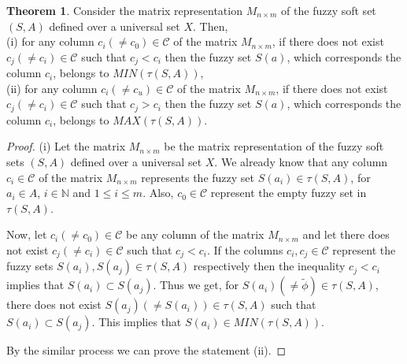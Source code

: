 \documentclass{article}
\theoremstyle{definition}
\newtheorem{theorem}{Theorem}[section]
\begin{document}
\begin{theorem}

    Consider the matrix representation $M_{n\times m}$ of the fuzzy soft set $(S,A)$ defined over a universal set $X$. Then, \\
    
    (i) for any column $c_i(\neq c_0) \in \mathcal{C}$ of the matrix $M_{n\times m}$, if there does not exist $c_j(\neq c_i )\in \mathcal{C}$ such that $c_j < c_i$ then the fuzzy set $S(a)$, which corresponds the column $c_i$, belongs to $MIN(\tau (S,A))$,\\

     (ii) for any column $c_i(\neq c_u) \in \mathcal{C}$ of the matrix $M_{n\times m}$, if there does not exist $c_j(\neq c_i) \in \mathcal{C}$ such that $c_j > c_i$ then the fuzzy set $S(a)$, which corresponds the column $c_i$, belongs to $MAX(\tau (S,A))$.\\
\end{theorem}

\begin{proof}

(i) Let the matrix $M_{n\times m}$ be the matrix representation of the fuzzy soft sets $(S,A)$ defined over a universal set $X$. We already know that any column $c_i\in \mathcal{C}$ of the matrix $M_{n\times m}$ represents the fuzzy set $S(a_i)\in \tau(S,A)$, for $a_i\in A$, $i\in \mathbb{N}$ and $1\leq i \leq m$. Also, $c_0\in \mathcal{C}$ represent the empty fuzzy set in $\tau(S,A)$.

Now, let $c_i(\neq c_0) \in \mathcal{C}$ be any column of the matrix $M_{n\times m}$ and let there does not exist $c_j(\neq c_i )\in \mathcal{C}$ such that $c_j < c_i$. If the columns $c_i, c_j\in \mathcal{C}$ represent the fuzzy sets $S(a_i), S(a_j)\in \tau(S,A)$ respectively then the inequality $c_j < c_i$ implies that $S(a_i) \subset S(a_j)$. Thus we get, for $S(a_i) (\neq \tilde{\phi}) \in \tau(S,A)$, there does not exist $S(a_j)(\neq S(a_i)) \in \tau(S,A)$ such that  $S(a_i)\subset S(a_j)$. This implies that $S(a_i) \in MIN(\tau (S,A))$.

By the similar process we can prove the statement (ii).
\end{proof}
\end{document}

